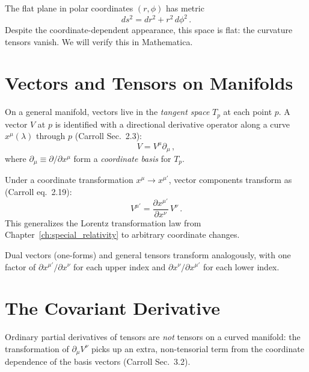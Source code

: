 \begin{example}
\label{ex:polar_metric}
The flat plane in polar coordinates $(r, \phi)$ has metric
\begin{equation}
    ds^2 = dr^2 + r^2\, d\phi^2 \,.
    \label{eq:polar_metric}
\end{equation}
Despite the coordinate-dependent appearance, this space is flat:
the curvature tensors vanish.  We will verify this in Mathematica.
\end{example}


\section{Vectors and Tensors on Manifolds}
\label{sec:vectors_manifolds}

On a general manifold, vectors live in the \emph{tangent space} $T_p$
at each point $p$.  A vector $V$ at $p$ is identified with a directional
derivative operator along a curve $x^\mu(\lambda)$ through $p$
(Carroll Sec.~2.3):
\begin{equation}
    V = V^\mu \partial_\mu \,,
    \label{eq:vector_as_derivative}
\end{equation}
where $\partial_\mu \equiv \partial/\partial x^\mu$ form a
\emph{coordinate basis} for $T_p$.

Under a coordinate transformation $x^\mu \to x^{\mu'}$, vector
components transform as (Carroll eq.~2.19):
\begin{equation}
    V^{\mu'} = \frac{\partial x^{\mu'}}{\partial x^\nu}\, V^\nu \,.
    \label{eq:vector_transform_general}
\end{equation}
This generalizes the Lorentz transformation law from Chapter~\ref{ch:special_relativity} to
arbitrary coordinate changes.

Dual vectors (one-forms) and general tensors transform analogously, with
one factor of $\partial x^{\mu'}/\partial x^\nu$ for each upper index
and $\partial x^\nu/\partial x^{\mu'}$ for each lower index.


\section{The Covariant Derivative}
\label{sec:covariant_derivative}

Ordinary partial derivatives of tensors are \emph{not} tensors on a
curved manifold: the transformation of $\partial_\mu V^\nu$ picks up an
extra, non-tensorial term from the coordinate dependence of the basis
vectors (Carroll Sec.~3.2).

